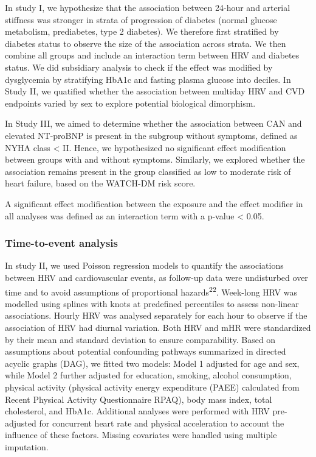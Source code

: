 \documentclass[
  a4paper,
  headsepline=true,
  open=any]{scrbook}
\begin{document}
In study I, we hypothesize that the association between 24-hour and
arterial stiffness was stronger in strata of progression of diabetes
(normal glucose metabolism, prediabetes, type 2 diabetes). We therefore
first stratified by diabetes status to observe the size of the
association across strata. We then combine all groups and include an
interaction term between HRV and diabetes status. We did subsidiary
analysis to check if the effect was modified by dysglycemia by
stratifying HbA1c and fasting plasma glucose into deciles. In Study II,
we quatified whether the association between multiday HRV and CVD
endpoints varied by sex to explore potential biological dimorphism.

In Study III, we aimed to determine whether the association between CAN
and elevated NT-proBNP is present in the subgroup without symptoms,
defined as NYHA class \textless{} II. Hence, we hypothesized no
significant effect modification between groups with and without
symptoms. Similarly, we explored whether the association remains present
in the group classified as low to moderate risk of heart failure, based
on the WATCH-DM risk score.

A significant effect modification between the exposure and the effect
modifier in all analyses was defined as an interaction term with a
p-value \textless{} 0.05.

\hypertarget{time-to-event-analysis}{%
\subsubsection{Time-to-event analysis}\label{time-to-event-analysis}}

In study II, we used Poisson regression models to quantify the
associations between HRV and cardiovascular events, as follow-up data
were undisturbed over time and to avoid assumptions of proportional
hazards\textsuperscript{22}. Week-long HRV was modelled using splines
with knots at predefined percentiles to assess non-linear associations.
Hourly HRV was analysed separately for each hour to observe if the
association of HRV had diurnal variation. Both HRV and mHR were
standardized by their mean and standard deviation to ensure
comparability. Based on assumptions about potential confounding pathways
summarized in directed acyclic graphs (DAG), we fitted two models: Model
1 adjusted for age and sex, while Model 2 further adjusted for
education, smoking, alcohol consumption, physical activity (physical
activity energy expenditure (PAEE) calculated from Recent Physical
Activity Questionnaire RPAQ), body mass index, total cholesterol, and
HbA1c. Additional analyses were performed with HRV pre-adjusted for
concurrent heart rate and physical acceleration to account the influence
of these factors. Missing covariates were handled using multiple
imputation.
\end{document}
